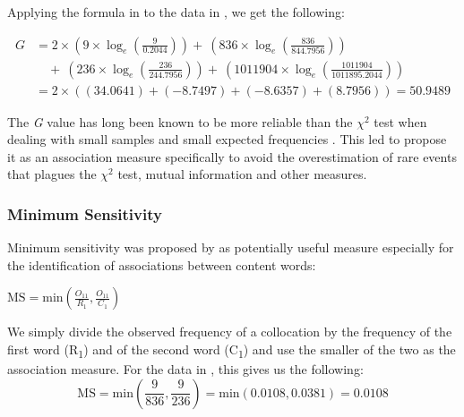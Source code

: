 Applying the formula in  to the data in , we get the following:

\begin{equation*}
\begin{split}
G & = 2 \times \left( 9 \times \log_e \left( \frac{9}{0.2044} \right) \right) +\ \left( 836 \times \log_e \left( \frac{836}{844.7956} \right) \right)\\
& \quad +\ \left( 236 \times \log_e \left( \frac{236}{244.7956} \right) \right) +\ \left( 1011904 \times \log_e \left( \frac{1011904}{1011895.2044} \right) \right)\\
& = 2 \times \left( \left( 34.0641 \right) + \left( -8.7497 \right) + \left( -8.6357 \right) + \left( 8.7956 \right) \right) = 50.9489
\end{split}
\end{equation*}

The \emph{G}  value has long been known to be more reliable than the $\chi^2$  test when dealing with small samples and small expected  frequencies \citep[134ff]{read_goodness--fit_1988}. This led \citet{dunning_accurate_1993} to propose it as an association  measure  specifically to avoid the overestimation of rare events that plagues the $\chi^2$  test, mutual information  and other measures.

\subsubsection{Minimum Sensitivity}
\label{sec:amminimumsensitivity}

Minimum sensitivity  was proposed by \citet{pedersen_dependent_1998} as potentially useful measure especially for the identification of associations  between content words:

\begin{exe}
\ex $\displaystyle{\text{MS} = \text{min} \left ( \frac{O_{11}}{R_1},\frac{O_{11}}{C_1} \right )}$
\label{ex:minsens}
\end{exe}

We simply divide the observed frequency  of a collocation  by the frequency of the first word (R\textsubscript{1}) and of the second word (C\textsubscript{1}) and use the smaller of the two as the association  measure.  For the data in , this gives us the following:
\[\text{MS} = \text{min} \left( \frac{9}{836}, \frac{9}{236} \right) = \text{min} \left( 0.0108,0.0381 \right) = 0.0108\]

